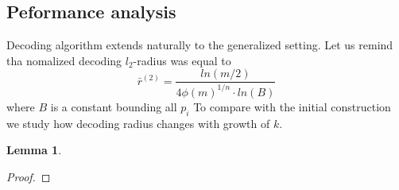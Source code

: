 \documentclass[12pt]{article}
\newtheorem{lemma}{Lemma}
\begin{document}
\subsection{Peformance analysis}
Decoding algorithm extends naturally to the generalized setting. Let us remind tha nomalized decoding $l_{2}$-radius was equal to
\begin{equation}
    \bar r^{(2)} = \frac{ln(m/2)}{4 \phi(m)^{1/n} \cdot ln(B)}
\end{equation}
where $B$ is a constant bounding all $p_{i}$
To compare with the initial construction we study how decoding radius changes with growth of $k$.

\begin{lemma}

\end{lemma}
\begin{proof}

\end{proof}
\end{document}
